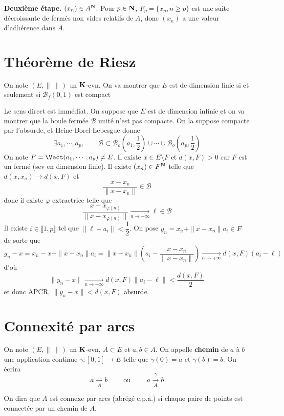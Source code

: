 \textbf{Deuxième étape.} $(x_n) \in  A^{\mathbf N}$. Pour $p \in  \mathbf N$, $F_p=\overline{ \{x_p, n\geq p\}  }$ est une suite décroissante de fermés non vides relatifs de $A$, donc  $(x_n)$ a une valeur d'adhérence dans  $A$.

\section{Théorème de Riesz}

On note  $(E, \|\;\|)$ un $\mathbf K$-evn. On va montrer que $E$ est de dimension finie  si et seulement si $\mathcal  B_f(0,1)$ est compact

Le sens direct est immédiat. On suppose que $E$ est de dimension infinie et on va montrer que la boule fermée $\mathcal  B$ unité n'est pas compacte. On la suppose compacte par l'absurde, et Heine-Borel-Lebesgue donne \[
    \exists  a_1,\cdots ,a_p , \qquad  \mathcal  B \subset \mathcal  B_o(a_1, \frac{1}{2})\cup \cdots  \cup \mathcal B_o(a_p,\frac{1}{2})
\] 
On note $F=\Vect(a_1,\cdots ,a_p)\neq E$. Il existe $x \in  E\setminus F$ et $d(x, F)>0$ car $F$ est un fermé (sev en dimension finie). Il existe $(x_n) \in  F^{\mathbf N}$ telle que $d(x,x_n)\longrightarrow d(x, F)$ et  \[
\frac{x-x_n}{\|x-x_n\|} \in  \mathcal  B
\] 
donc il existe $\varphi$ extractrice telle que  \[
    \frac{x-x_{\varphi(n)}}{\|x-x_{\varphi(n)}\|} \xrightarrow[n\to+\infty]{} \ell \in  \mathcal  B
\] 
Il existe $i \in  \llbracket 1, p \rrbracket $ tel que $\|\ell  - a_i\|<\dfrac{1}{2}.$ On pose $y_n=x_n+ \|x-x_n\|a_i \in  F$ de sorte que \[
    y_n-x=x_n-x+\|x-x_n\|a_i=\|x-x_n\|\left( a_i-\frac{x-x_n}{\|x-x_n\|} \right) \xrightarrow[n\to+\infty]{} d(x,F)(a_i-\ell )
\] 
d'où \[
    \|y_n-x\| \xrightarrow[n\to+\infty]{}d(x,F)\|a_i-\ell \|<\frac{d(x,F)}{2}
\] 
et donc APCR, $\|y_n-x\|<d(x,F)$ absurde.

\section{Connexité par arcs}

On note $(E, \|\;\|)$ un $\mathbf K$-evn, $A\subset E$ et  $a, b \in  A$. On appelle \textbf{chemin} de $a$ à  $b$ une application continue  $\gamma:[0, 1]\to E$ telle que $\gamma(0)=a$ et  $\gamma(b)=b$. On écrira \[
    a \xrightarrow[A]{}b \qquad \text{ ou } \qquad  a \xrightarrow[A]{\gamma}b
\] 

\begin{dfn}
    On dira que $A$ est connexe par arcs (abrégé c.p.a.)   si chaque paire de points est connectée par un chemin de $A$.
\end{dfn}

